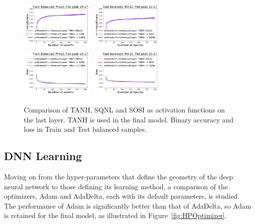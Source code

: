 \begin{figure}[!htb]
\centering
\includegraphics[width=0.32\textwidth]{plots/plot_01_1_overlay_graph_accuracyBinary_Train_ActivationFunctionLastLayer.pdf}
\includegraphics[width=0.32\textwidth]{plots/plot_01_1_overlay_graph_accuracyBinary_Test_ActivationFunctionLastLayer.pdf}\\
\includegraphics[width=0.32\textwidth]{plots/plot_01_1_overlay_graph_loss_Train_ActivationFunctionLastLayer.pdf}
\includegraphics[width=0.32\textwidth]{plots/plot_01_1_overlay_graph_loss_Test_ActivationFunctionLastLayer.pdf}\\
\caption{Comparison of TANH, SQNL and SOSI as activation functions on the last layer. TANH is used in the final model. Binary accuracy and loss in Train and Test balanced samples.}
\label{fig:HPActivationFunctionLastLayer}
\end{figure}

\subsection{DNN Learning}
\label{sec:DNNLearning}

Moving on from the hyper-parameters that define the geometry of the deep neural network to those defining its learning method, a comparison of the optimizers, Adam and AdaDelta, each with its default parameters, is studied. The performance of Adam is significantly better than that of AdaDelta, so Adam is retained for the final model, as illustrated in Figure~\ref{fig:HPOptimizer}.

